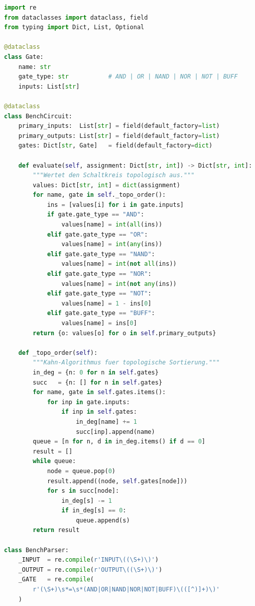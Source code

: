 ﻿\documentclass[a4paper,12pt]{article}
\theoremstyle{definition}
\begin{document}
\begin{lstlisting}[language=Python, caption={BenchParser -- Liest ISCAS'85-Bench-Dateien in BooleanCircuit-Objekte ein}]
import re
from dataclasses import dataclass, field
from typing import Dict, List, Optional

@dataclass
class Gate:
    name: str
    gate_type: str           # AND | OR | NAND | NOR | NOT | BUFF
    inputs: List[str]

@dataclass
class BenchCircuit:
    primary_inputs:  List[str] = field(default_factory=list)
    primary_outputs: List[str] = field(default_factory=list)
    gates: Dict[str, Gate]   = field(default_factory=dict)

    def evaluate(self, assignment: Dict[str, int]) -> Dict[str, int]:
        """Wertet den Schaltkreis topologisch aus."""
        values: Dict[str, int] = dict(assignment)
        for name, gate in self._topo_order():
            ins = [values[i] for i in gate.inputs]
            if gate.gate_type == "AND":
                values[name] = int(all(ins))
            elif gate.gate_type == "OR":
                values[name] = int(any(ins))
            elif gate.gate_type == "NAND":
                values[name] = int(not all(ins))
            elif gate.gate_type == "NOR":
                values[name] = int(not any(ins))
            elif gate.gate_type == "NOT":
                values[name] = 1 - ins[0]
            elif gate.gate_type == "BUFF":
                values[name] = ins[0]
        return {o: values[o] for o in self.primary_outputs}

    def _topo_order(self):
        """Kahn-Algorithmus fuer topologische Sortierung."""
        in_deg = {n: 0 for n in self.gates}
        succ   = {n: [] for n in self.gates}
        for name, gate in self.gates.items():
            for inp in gate.inputs:
                if inp in self.gates:
                    in_deg[name] += 1
                    succ[inp].append(name)
        queue = [n for n, d in in_deg.items() if d == 0]
        result = []
        while queue:
            node = queue.pop(0)
            result.append((node, self.gates[node]))
            for s in succ[node]:
                in_deg[s] -= 1
                if in_deg[s] == 0:
                    queue.append(s)
        return result

class BenchParser:
    _INPUT  = re.compile(r'INPUT\((\S+)\)')
    _OUTPUT = re.compile(r'OUTPUT\((\S+)\)')
    _GATE   = re.compile(
        r'(\S+)\s*=\s*(AND|OR|NAND|NOR|NOT|BUFF)\(([^)]+)\)'
    )


\end{lstlisting}
\end{document}

